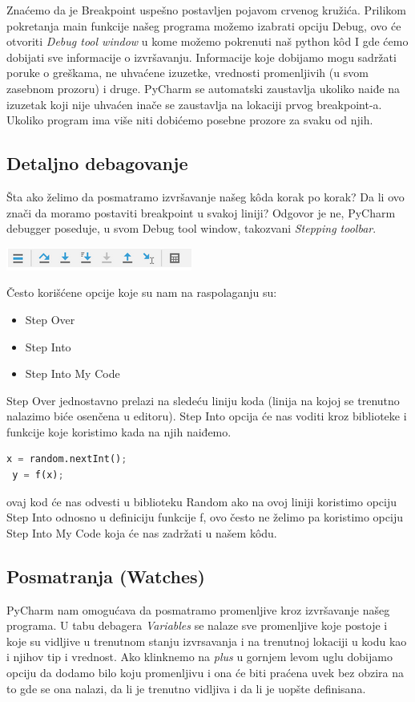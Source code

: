 \documentclass[a4paper]{article}
\begin{document}
Znaćemo da je Breakpoint uspešno postavljen pojavom crvenog kružića\cite{pyCharm}. Prilikom pokretanja main funkcije našeg programa možemo izabrati opciju Debug, ovo će otvoriti \emph{Debug tool window} u kome možemo pokrenuti naš python k\^{o}d I gde ćemo dobijati sve informacije o izvršavanju. Informacije koje dobijamo mogu sadržati poruke o greškama, ne uhvaćene izuzetke, vrednosti promenljivih (u svom zasebnom prozoru) i druge\cite{pyCharm}. PyCharm se automatski zaustavlja ukoliko naiđe na izuzetak koji nije uhvaćen inače se zaustavlja na lokaciji prvog breakpoint-a\cite{pyCharm}. Ukoliko program ima više niti dobićemo posebne prozore za svaku od njih\cite{pyCharm}.
\subsection{Detaljno debagovanje}
Šta ako želimo da posmatramo izvršavanje našeg k\^{o}da korak po korak? Da li ovo znači da moramo postaviti breakpoint u svakoj liniji? Odgovor je ne, PyCharm debugger poseduje, u svom Debug tool window, takozvani \emph{Stepping toolbar}.

\includegraphics[scale = 0.6]{2}

Često korišćene opcije koje su nam na raspolaganju su:
\begin{itemize}
\item  Step Over
\item  Step Into
\item Step Into My Code
\end{itemize}
Step Over jednostavno prelazi na sledeću liniju koda (linija na kojoj se trenutno nalazimo biće osenčena u editoru). Step Into opcija će nas voditi kroz biblioteke i funkcije koje koristimo kada na njih naiđemo\cite{pyCharm}.
\begin{lstlisting}[language = Python, caption={Primer neki}]
 x = random.nextInt();
 y = f(x);
\end{lstlisting} 
 ovaj kod će nas odvesti u biblioteku Random ako na ovoj liniji koristimo opciju Step Into odnosno u definiciju funkcije f, ovo često ne želimo pa koristimo opciju Step Into My Code koja će nas zadržati u našem k\^{o}du\cite{pyCharm}. 
\subsection{Posmatranja (Watches)}
PyCharm nam omogućava da posmatramo promenljive kroz izvršavanje našeg programa. U tabu debagera \emph{Variables} se nalaze sve promenljive koje postoje i koje su vidljive u trenutnom stanju izvrsavanja i na trenutnoj lokaciji u kodu kao i njihov tip i vrednost\cite{pyCharm}. Ako klinknemo na \emph {plus} u gornjem levom uglu dobijamo opciju da dodamo bilo koju promenljivu i ona će biti praćena uvek bez obzira na to gde se ona nalazi, da li je trenutno vidljiva i da li je uopšte definisana\cite{pyCharm}.
\end{document}
